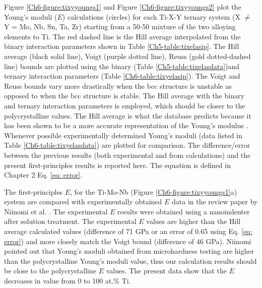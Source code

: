 Figure \ref{Ch6-figure:tixyyoungs1} and Figure \ref{Ch6-figure:tixyyoungs2} plot the Young's moduli ($E$) calculations (circles) for each Ti-X-Y ternary system (X $\neq$ Y = Mo, Nb, Sn, Ta, Zr) starting from a 50-50 mixture of the two alloying elements to Ti. The red dashed line is the Hill average interpolated from the binary interaction parameters shown in Table \ref{Ch5-table:tixelasip}. The Hill average (black solid line), Voigt (purple dotted line), Reuss (gold dotted-dashed line) bounds are plotted using the binary (Table \ref{Ch5-table:tixelasdata})and ternary interaction parameters (Table \ref{Ch6-table:tixyelasip}). The Voigt and Reuss bounds vary more drastically when the bcc structure is unstable as opposed to when the bcc structure is stable. The Hill average with the binary and ternary interaction parameters is employed, which should be closer to the polycrystalline values. The Hill average is what the database predicts because it has been shown to be a more accurate representation of the Young's modulus \cite{Yue2009,Chung1967}. Whenever possible experimentally determined Young's moduli \cite{Niinomi2012,Mohammed2014,Nozoe2007,Geetha2009} (data listed in Table \ref{Ch6-table:tixyelasdata}) are plotted for comparison. The difference/error between the previous results (both experimental and from calculations) and the present first-principles results is reported here. The equation is defined in Chapter 2 Eq. \ref{eq: error}.

The first-principles $E$, for the Ti-Mo-Nb (Figure \ref{Ch6-figure:tixyyoungs1}a) system are compared with experimentally obtained $E$ data in the review paper by Niinomi et al. \cite{Niinomi2012}. The experimental $E$ results were obtained using a nanoindenter after solution treatment. The experimental $E$ values are higher than the Hill average calculated values (difference of 71 GPa or an error of 0.65 using Eq. \ref{eq: error}) and more closely match the Voigt bound (difference of 46 GPa). Niinomi \cite{Niinomi2012} pointed out that Young's moduli obtained from microhardness testing are higher than the polycrystalline Young's moduli value, thus our calculation results should be close to the polycrystalline $E$ values. The present data show that the $E$ decreases in value from 0 to 100 at.\% Ti. 

